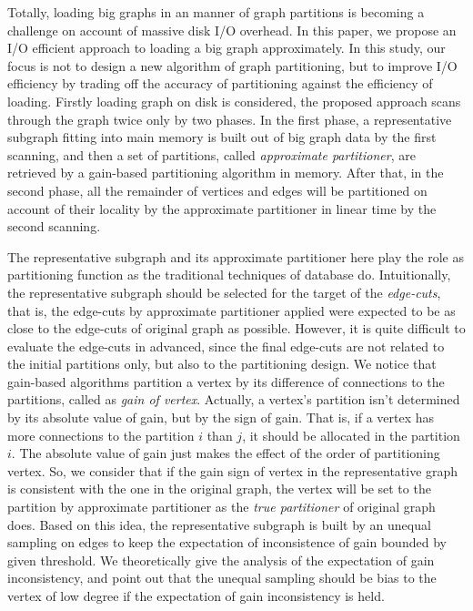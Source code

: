 \documentclass{sig-alternate-2013}
\begin{document}
Totally, loading big graphs in an manner of graph partitions is becoming a challenge on account of massive disk I/O overhead. In this paper, we propose an I/O efficient approach to loading a big graph approximately. In this study, our focus is not to design a new algorithm of graph partitioning, but to improve I/O efficiency by trading off the accuracy of partitioning against the efficiency of loading. Firstly loading graph on disk is considered, the proposed approach scans through the graph twice only by two phases. In the first phase, a representative subgraph fitting into main memory is built out of big graph data by the first scanning, and then a set of partitions, called \textit{approximate partitioner}, are retrieved by a gain-based partitioning algorithm in memory. After that, in the second phase, all the remainder of vertices and edges will be partitioned on account of their locality by the approximate partitioner in linear time by the second scanning.

The representative subgraph and its approximate partitioner here play the role as partitioning function as the traditional techniques of database do. Intuitionally, the representative subgraph should be selected for the target of the \textit{edge-cuts}, that is, the edge-cuts by approximate partitioner applied were expected to be as close to the edge-cuts of original graph as possible. However, it is quite difficult to evaluate the edge-cuts in advanced, since the final edge-cuts are not related to the initial partitions only, but also to the partitioning design. We notice that gain-based algorithms partition a vertex by its difference of connections to the partitions, called as \textit{gain of vertex}. Actually, a vertex's partition isn't determined by its absolute value of gain, but by the sign of gain. That is, if a vertex has more connections to the partition $i$ than $j$, it should be allocated in the partition $i$. The absolute value of gain just makes the effect of the order of partitioning vertex. So, we consider that if the gain sign of vertex in the representative graph is consistent with the one in the original graph, the vertex will be set to the partition by approximate partitioner as the \textit{true partitioner} of original graph does. Based on this idea, the representative subgraph is built by an unequal sampling on edges to keep the expectation of inconsistence of gain bounded by given threshold. We theoretically give the analysis of the expectation of gain inconsistency, and point out that the unequal sampling should be bias to the vertex of low degree if the expectation of gain inconsistency is held.
\end{document}
